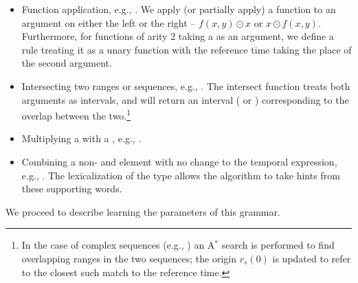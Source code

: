 \begin{itemize}
	\item Function application, e.g., .
		We apply (or partially apply) a function to an argument
			on either the left or the right -- $f(x,y) \odot x$ or $x \odot f(x,y)$.
		Furthermore, for functions of arity 2 taking a  as an argument,
			we define a rule treating it as a unary function with the reference time
			taking the place of the second argument.
	\item Intersecting two ranges or sequences, e.g., .
		The intersect function treats both arguments as intervals, and will return
			an interval ( or ) corresponding to the overlap
			between the two.\footnote{
				In the case of complex sequences 
					(e.g., ) an A$^{*}$
					search is performed to find overlapping ranges in the two sequences;
					the origin $r_s(0)$ is updated to refer to the closest such
					match to the reference time.
			}
	\item Multiplying a  with a , e.g., .
	\item Combining a non- and  element with no change to the
			temporal expression, e.g., .
		The lexicalization of the  type allows the algorithm
			to take hints from these supporting words.
\end{itemize}

We proceed to describe learning the parameters of this grammar.


